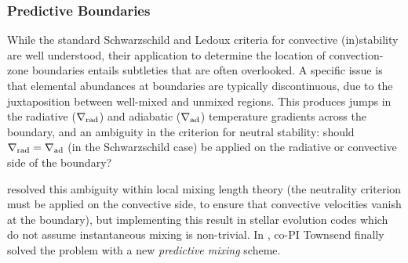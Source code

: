 {\color{brown}
\subsubsection{Predictive Boundaries}

While the standard Schwarzschild and Ledoux criteria for convective (in)stability are well understood, their application to determine the location of convection-zone boundaries entails subtleties that are often overlooked. A specific issue is that elemental abundances at boundaries are typically discontinuous, due to the juxtaposition between well-mixed and unmixed regions. This produces jumps in the radiative ($\nabla_{\rm rad}$) and adiabatic ($\nabla_{\rm ad}$) temperature gradients across the boundary, and an ambiguity in the criterion for neutral stability: should $\nabla_{\rm rad}=\nabla_{\rm ad}$ (in the Schwarzschild case) be applied on the radiative or convective side of the boundary?

\citet{Gabriel:2014} resolved this ambiguity within local mixing length theory (the neutrality criterion must be applied on the convective side, to ensure that convective velocities vanish at the boundary), but implementing this result in stellar evolution codes which do not assume instantaneous mixing is non-trivial. In \citet{Paxton:2017}, co-PI Townsend finally solved the problem with a new \emph{predictive mixing} scheme.

}